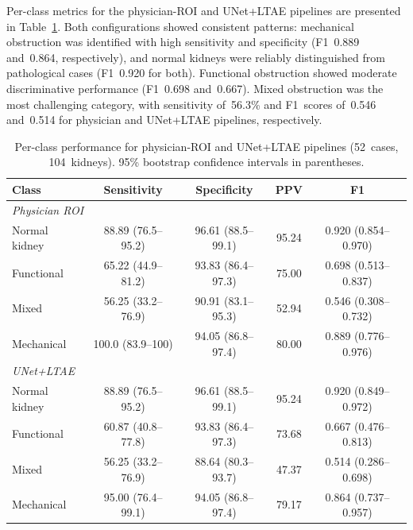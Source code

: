 \documentclass[sn-basic]{sn-jnl}
\begin{document}
Per-class metrics for the physician-ROI and UNet+LTAE
pipelines are presented in Table~\ref{tab:perclass}.  Both
configurations showed consistent patterns: mechanical
obstruction was identified with high sensitivity and
specificity (F1~0.889 and~0.864, respectively), and normal
kidneys were reliably distinguished from pathological cases
(F1~0.920 for both).  Functional obstruction showed moderate
discriminative performance (F1~0.698 and~0.667).  Mixed
obstruction was the most challenging category, with
sensitivity of~56.3\% and F1~scores of~0.546 and~0.514 for
physician and UNet+LTAE pipelines, respectively.

\begin{table}[t]
  \centering
  \caption{Per-class performance for physician-ROI and
    UNet+LTAE pipelines (52~cases, 104~kidneys).  95\%
    bootstrap confidence intervals in parentheses.}
  \label{tab:perclass}
  \small
  \begin{threeparttable}
    \begin{tabular}{lcccc}
      \toprule
      Class & Sensitivity & Specificity & PPV & F1 \\
      \midrule
      \multicolumn{5}{l}{\textit{Physician ROI}} \\
      \hspace{1em} Normal kidney & 88.89 (76.5--95.2) & 96.61 (88.5--99.1) & 95.24 & 0.920 (0.854--0.970) \\
      \hspace{1em} Functional & 65.22 (44.9--81.2) & 93.83 (86.4--97.3) & 75.00 & 0.698 (0.513--0.837) \\
      \hspace{1em} Mixed & 56.25 (33.2--76.9) & 90.91 (83.1--95.3) & 52.94 & 0.546 (0.308--0.732) \\
      \hspace{1em} Mechanical & 100.0 (83.9--100) & 94.05 (86.8--97.4) & 80.00 & 0.889 (0.776--0.976) \\
      \midrule
      \multicolumn{5}{l}{\textit{UNet+LTAE}} \\
      \hspace{1em} Normal kidney & 88.89 (76.5--95.2) & 96.61 (88.5--99.1) & 95.24 & 0.920 (0.849--0.972) \\
      \hspace{1em} Functional & 60.87 (40.8--77.8) & 93.83 (86.4--97.3) & 73.68 & 0.667 (0.476--0.813) \\
      \hspace{1em} Mixed & 56.25 (33.2--76.9) & 88.64 (80.3--93.7) & 47.37 & 0.514 (0.286--0.698) \\
      \hspace{1em} Mechanical & 95.00 (76.4--99.1) & 94.05 (86.8--97.4) & 79.17 & 0.864 (0.737--0.957) \\
      \bottomrule
    \end{tabular}
  \end{threeparttable}
\end{table}
\end{document}
